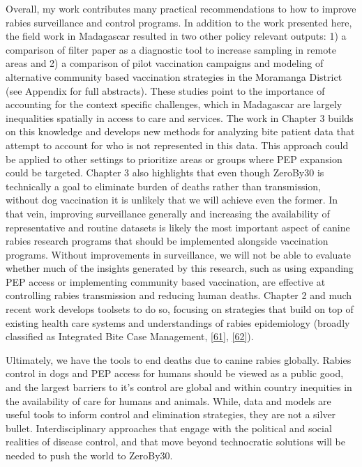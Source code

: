 \documentclass[
  oneside]{book}
\begin{document}
Overall, my work contributes many practical recommendations to how to improve rabies surveillance and control programs. In addition to the work presented here, the field work in Madagascar resulted in two other policy relevant outputs: 1) a comparison of filter paper as a diagnostic tool to increase sampling in remote areas and 2) a comparison of pilot vaccination campaigns and modeling of alternative community based vaccination strategies in the Moramanga District (see Appendix for full abstracts). These studies point to the importance of accounting for the context specific challenges, which in Madagascar are largely inequalities spatially in access to care and services. The work in Chapter 3 builds on this knowledge and develops new methods for analyzing bite patient data that attempt to account for who is not represented in this data. This approach could be applied to other settings to prioritize areas or groups where PEP expansion could be targeted. Chapter 3 also highlights that even though ZeroBy30 is technically a goal to eliminate burden of deaths rather than transmission, without dog vaccination it is unlikely that we will achieve even the former. In that vein, improving surveillance generally and increasing the availability of representative and routine datasets is likely the most important aspect of canine rabies research programs that should be implemented alongside vaccination programs. Without improvements in surveillance, we will not be able to evaluate whether much of the insights generated by this research, such as using expanding PEP access or implementing community based vaccination, are effective at controlling rabies transmission and reducing human deaths. Chapter 2 and much recent work develops toolsets to do so, focusing on strategies that build on top of existing health care systems and understandings of rabies epidemiology (broadly classified as Integrated Bite Case Management, \protect\hyperlink{ref-undurraga2017}{{[}61{]}}, \protect\hyperlink{ref-Lushasi2020}{{[}62{]}}).

Ultimately, we have the tools to end deaths due to canine rabies globally. Rabies control in dogs and PEP access for humans should be viewed as a public good, and the largest barriers to it's control are global and within country inequities in the availability of care for humans and animals. While, data and models are useful tools to inform control and elimination strategies, they are not a silver bullet. Interdisciplinary approaches that engage with the political and social realities of disease control, and that move beyond technocratic solutions will be needed to push the world to ZeroBy30.
\end{document}
